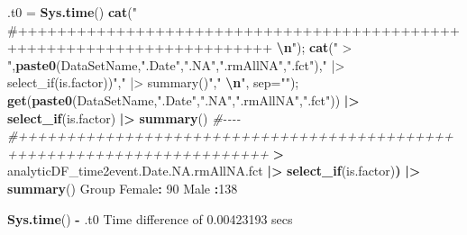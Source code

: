 \documentclass[
]{article}
\newenvironment{Shaded}{\begin{snugshade}}{\end{snugshade}}
\newcommand{\AttributeTok}[1]{\textcolor[rgb]{0.13,0.29,0.53}{#1}}
\newcommand{\CommentTok}[1]{\textcolor[rgb]{0.56,0.35,0.01}{\textit{#1}}}
\newcommand{\DecValTok}[1]{\textcolor[rgb]{0.00,0.00,0.81}{#1}}
\newcommand{\ErrorTok}[1]{\textcolor[rgb]{0.64,0.00,0.00}{\textbf{#1}}}
\newcommand{\FloatTok}[1]{\textcolor[rgb]{0.00,0.00,0.81}{#1}}
\newcommand{\FunctionTok}[1]{\textcolor[rgb]{0.13,0.29,0.53}{\textbf{#1}}}
\newcommand{\NormalTok}[1]{#1}
\newcommand{\OtherTok}[1]{\textcolor[rgb]{0.56,0.35,0.01}{#1}}
\newcommand{\SpecialCharTok}[1]{\textcolor[rgb]{0.81,0.36,0.00}{\textbf{#1}}}
\newcommand{\StringTok}[1]{\textcolor[rgb]{0.31,0.60,0.02}{#1}}
\begin{document}
\begin{Shaded}
\begin{Highlighting}[]

\NormalTok{.t0 }\OtherTok{=} \FunctionTok{Sys.time}\NormalTok{()}
\FunctionTok{cat}\NormalTok{(}\StringTok{"   \#++++++++++++++++++++++++++++++++++++++++++++++++++++++++++++++++++++++++    }\SpecialCharTok{\textbackslash{}n}\StringTok{"}\NormalTok{); }\FunctionTok{cat}\NormalTok{(}\StringTok{" \textgreater{} "}\NormalTok{,}\FunctionTok{paste0}\NormalTok{(DataSetName,}\StringTok{".Date"}\NormalTok{,}\StringTok{".NA"}\NormalTok{,}\StringTok{".rmAllNA"}\NormalTok{,}\StringTok{".fct"}\NormalTok{),}\StringTok{" |\textgreater{} select\_if(is.factor))"}\NormalTok{,}\StringTok{" |\textgreater{} summary()"}\NormalTok{,}\StringTok{"  }\SpecialCharTok{\textbackslash{}n}\StringTok{"}\NormalTok{, }\AttributeTok{sep=}\StringTok{""}\NormalTok{); }\FunctionTok{get}\NormalTok{(}\FunctionTok{paste0}\NormalTok{(DataSetName,}\StringTok{".Date"}\NormalTok{,}\StringTok{".NA"}\NormalTok{,}\StringTok{".rmAllNA"}\NormalTok{,}\StringTok{".fct"}\NormalTok{)) }\SpecialCharTok{|\textgreater{}} \FunctionTok{select\_if}\NormalTok{(is.factor) }\SpecialCharTok{|\textgreater{}} \FunctionTok{summary}\NormalTok{() }\CommentTok{\#{-}{-}{-}{-}  }
   \CommentTok{\#++++++++++++++++++++++++++++++++++++++++++++++++++++++++++++++++++++++++    }
 \SpecialCharTok{\textgreater{}}\NormalTok{ analyticDF\_time2event.Date.NA.rmAllNA.fct }\SpecialCharTok{|\textgreater{}} \FunctionTok{select\_if}\NormalTok{(is.factor)}\ErrorTok{)} \SpecialCharTok{|\textgreater{}} \FunctionTok{summary}\NormalTok{()  }
\NormalTok{    Group    }
\NormalTok{ Female}\SpecialCharTok{:} \DecValTok{90}  
\NormalTok{ Male  }\SpecialCharTok{:}\DecValTok{138}  
\end{Highlighting}
\end{Shaded}

\begin{Shaded}
\begin{Highlighting}[]
\FunctionTok{Sys.time}\NormalTok{() }\SpecialCharTok{{-}}\NormalTok{ .t0}
\NormalTok{Time difference of }\FloatTok{0.00423193}\NormalTok{ secs}
\end{Highlighting}
\end{Shaded}
\end{document}
